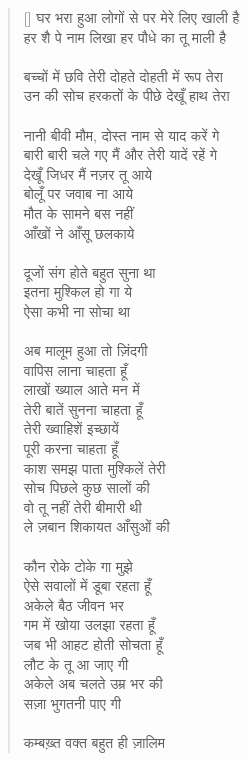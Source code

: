 \begin{verse}[\versewidth]\texthindi{
घर भरा हुआ लोगों से पर मेरे लिए खाली है\\
हर शै पे नाम लिखा हर पौधे का तू माली है\\
\\
बच्चों में छवि तेरी दोहते दोहती में रूप तेरा\\
उन की सोच हरकतों के पीछे देखूँ हाथ तेरा\\
\\
नानी बीवी मौम, दोस्त नाम से याद करें गे\\
बारी बारी चले गए मैं और तेरी यादें रहें गे\\
देखूँ जिधर मैं नज़र तू आये\\
बोलूँ पर जवाब ना आये\\
मौत के सामने बस नहीं\\
आँखों ने आँसू छलकाये\\
\\
दूजों संग होते बहुत सुना था\\
इतना मुश्किल हो गा ये\\
ऐसा कभी ना सोचा था\\
\\
अब मालूम हुआ तो ज़िंदगी\\
वापिस लाना चाहता हूँ\\
लाखों ख्याल आते मन में\\
तेरी बातें सुनना चाहता हूँ\\
तेरी ख्वाहिशें इच्छायें\\
पूरी करना चाहता हूँ\\
काश समझ पाता मुश्किलें तेरी\\
सोच पिछले कुछ सालों की\\
वो तू नहीं तेरी बीमारी थी\\
ले ज़बान शिकायत आँसुओं की\\
\\
कौन रोके टोके गा मुझे\\
ऐसे सवालों में डूबा रहता हूँ\\
अकेले बैठ जीवन भर\\
गम में खोया उलझा रहता हूँ\\
जब भी आहट होती सोचता हूँ\\
लौट के तू आ जाए गी\\
अकेले अब चलते उम्र भर की\\
सज़ा भुगतनी पाए गी\\
\\
कम्बख़्त वक्त बहुत ही ज़ालिम\\
}
\end{verse}
